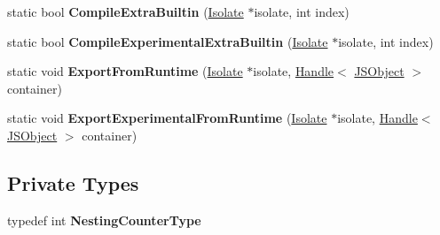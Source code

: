 \begin{DoxyCompactItemize}
\item 
static bool {\bfseries Compile\+Extra\+Builtin} (\hyperlink{classv8_1_1internal_1_1_isolate}{Isolate} $\ast$isolate, int index)\hypertarget{classv8_1_1internal_1_1_bootstrapper_abb1990954b123388d01ed8bccb6f3d8f}{}\label{classv8_1_1internal_1_1_bootstrapper_abb1990954b123388d01ed8bccb6f3d8f}

\item 
static bool {\bfseries Compile\+Experimental\+Extra\+Builtin} (\hyperlink{classv8_1_1internal_1_1_isolate}{Isolate} $\ast$isolate, int index)\hypertarget{classv8_1_1internal_1_1_bootstrapper_a9a29ce6115edf6e3bce85c50c32b7b1d}{}\label{classv8_1_1internal_1_1_bootstrapper_a9a29ce6115edf6e3bce85c50c32b7b1d}

\item 
static void {\bfseries Export\+From\+Runtime} (\hyperlink{classv8_1_1internal_1_1_isolate}{Isolate} $\ast$isolate, \hyperlink{classv8_1_1internal_1_1_handle}{Handle}$<$ \hyperlink{classv8_1_1internal_1_1_j_s_object}{J\+S\+Object} $>$ container)\hypertarget{classv8_1_1internal_1_1_bootstrapper_a39826d28eb8d93bf081b9308e3848d24}{}\label{classv8_1_1internal_1_1_bootstrapper_a39826d28eb8d93bf081b9308e3848d24}

\item 
static void {\bfseries Export\+Experimental\+From\+Runtime} (\hyperlink{classv8_1_1internal_1_1_isolate}{Isolate} $\ast$isolate, \hyperlink{classv8_1_1internal_1_1_handle}{Handle}$<$ \hyperlink{classv8_1_1internal_1_1_j_s_object}{J\+S\+Object} $>$ container)\hypertarget{classv8_1_1internal_1_1_bootstrapper_a6660dcac23559660c81c0cf0d5e1d537}{}\label{classv8_1_1internal_1_1_bootstrapper_a6660dcac23559660c81c0cf0d5e1d537}

\end{DoxyCompactItemize}
\subsection*{Private Types}
\begin{DoxyCompactItemize}
\item 
typedef int {\bfseries Nesting\+Counter\+Type}\hypertarget{classv8_1_1internal_1_1_bootstrapper_ae6ce8d07952b3e34fdab2b1b6eb6108a}{}\label{classv8_1_1internal_1_1_bootstrapper_ae6ce8d07952b3e34fdab2b1b6eb6108a}

\end{DoxyCompactItemize}

